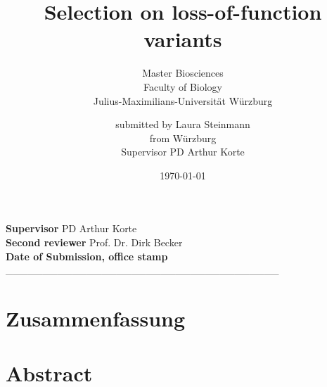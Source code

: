 \documentclass[ngerman,onecolumn,bibliography=totocnumbered]{scrreprt}
\begin{document}
\titlehead{\centering\texttt{[image: CCTB\_Logo.pdf]}}
\title{Selection on loss-of-function variants}
\subject{Master Thesis}
\subtitle{\vspace{1cm}Master Biosciences \\ Faculty of Biology \\ Julius-Maximilians-Universität Würzburg}
\author{submitted by Laura Steinmann \\from Würzburg\\ Supervisor PD Arthur Korte}

\date{\today}


\maketitle
\thispagestyle{empty}
\newpage
\vspace*{\fill}
\begingroup
\centering
\textsf{\textbf{Supervisor} \quad PD Arthur Korte}\\
\vspace{2cm}
\textsf{\textbf{Second reviewer} \quad Prof. Dr. Dirk Becker} \\
\vspace{2cm}
\textsf{\textbf{Date of Submission, office stamp}}\\
\vspace{10mm}
\_\_\_\_\_\_\_\_\_\_\_\_\_\_\_\_\_\_\_\_\_\_\_\_\_\_\_\_\_\_\_\_\_\_\_\_\_\\
\endgroup
\vspace*{{\fill}}
\setcounter{page}{1}
\chapter*{Zusammenfassung}
\chapter*{Abstract}
\newpage
\tableofcontents
{}

\newpage

\newpage

\newpage

\newpage
\appendix
\addtocounter{chapter}{1}
\listoffigures
\printbibliography
\newpage
\end{document}
